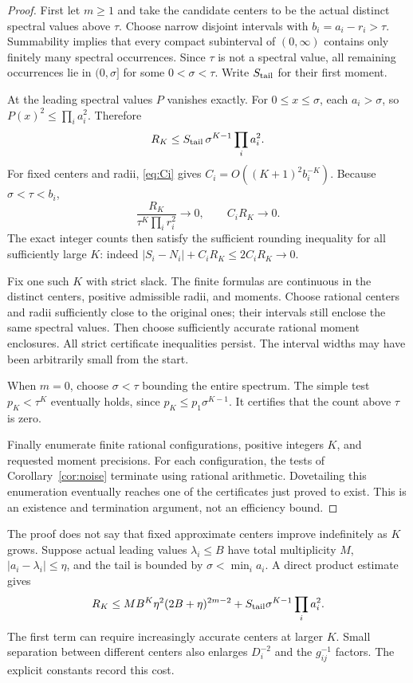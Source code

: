 \begin{proof}
First let $m\ge1$ and take the candidate centers to be the actual distinct
spectral values above $\tau$. Choose narrow disjoint intervals with
$b_i=a_i-r_i>\tau$. Summability implies that every compact subinterval of
$(0,\infty)$ contains only finitely many spectral occurrences. Since $\tau$
is not a spectral value, all remaining occurrences lie in $(0,\sigma]$ for
some $0<\sigma<\tau$. Write $S_{\rm tail}$ for their first moment.

At the leading spectral values $P$ vanishes exactly. For $0\le x\le\sigma$,
each $a_i>\sigma$, so $P(x)^2\le\prod_i a_i^2$. Therefore
\begin{equation}\label{eq:taildecay}
 R_K\le S_{\rm tail}\,\sigma^{K-1}\prod_i a_i^2.
\end{equation}
For fixed centers and radii, \eqref{eq:Ci} gives
$C_i=O((K+1)^2b_i^{-K})$. Because $\sigma<\tau<b_i$,
\[
 \frac{R_K}{\tau^K\prod_i r_i^2}\longrightarrow0,
 \qquad C_iR_K\longrightarrow0.
\]
The exact integer counts then satisfy the sufficient rounding inequality for
all sufficiently large $K$: indeed
$|S_i-N_i|+C_iR_K\le2C_iR_K\to0$.

Fix one such $K$ with strict slack. The finite formulas are continuous in
the distinct centers, positive admissible radii, and moments. Choose
rational centers and radii sufficiently close to the original ones; their
intervals still enclose the same spectral values. Then choose sufficiently
accurate rational moment enclosures. All strict certificate inequalities
persist. The interval widths may have been arbitrarily small from the start.

When $m=0$, choose $\sigma<\tau$ bounding the entire spectrum. The simple
test $p_K<\tau^K$ eventually holds, since
$p_K\le p_1\sigma^{K-1}$. It certifies that the count above $\tau$ is zero.

Finally enumerate finite rational configurations, positive integers $K$,
and requested moment precisions. For each configuration, the tests of
Corollary~\ref{cor:noise} terminate using rational arithmetic. Dovetailing
this enumeration eventually reaches one of the certificates just proved
to exist. This is an existence and termination argument, not an efficiency
bound.
\end{proof}

\begin{remark}
The proof does not say that fixed approximate centers improve indefinitely
as $K$ grows. Suppose actual leading values $\lambda_i\le B$ have total
multiplicity $M$, $|a_i-\lambda_i|\le\eta$, and the tail is bounded by
$\sigma<\min_i a_i$. A direct product estimate gives
\[
 R_K\le MB^K\eta^2(2B+\eta)^{2m-2}
       +S_{\rm tail}\sigma^{K-1}\prod_i a_i^2.
\]
The first term can require increasingly accurate centers at larger $K$.
Small separation between different centers also enlarges $D_i^{-2}$ and
the $g_{ij}^{-1}$ factors. The explicit constants record this cost.
\end{remark}

